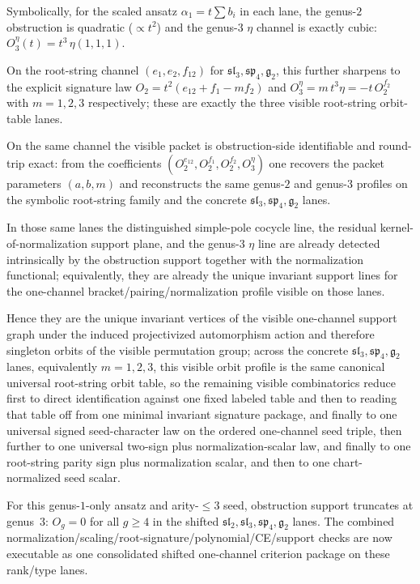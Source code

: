   Symbolically, for the scaled ansatz
  $\alpha_1=t\sum b_i$ in each lane, the genus-$2$ obstruction
  is quadratic ($\propto t^2$) and the genus-$3$ $\eta$ channel
  is exactly cubic:
  $O_3^\eta(t)=t^3\,\eta(1,1,1)$.

  On the root-string channel $(e_1,e_2,f_{12})$ for
  $\mathfrak{sl}_3,\mathfrak{sp}_4,\mathfrak{g}_2$, this further
  sharpens to the explicit signature law
  $O_2=t^2(e_{12}+f_1-m f_2)$ and
  $O_3^\eta=m\,t^3\eta=-t\,O_2^{f_2}$ with
  $m=1,2,3$ respectively; these are exactly the three visible
  root-string orbit-table lanes.

  On the same channel the visible packet is
  obstruction-side identifiable and round-trip exact: from the
  coefficients $(O_2^{e_{12}},O_2^{f_1},O_2^{f_2},O_3^\eta)$ one
  recovers the packet parameters $(a,b,m)$ and reconstructs the same
  genus-$2$ and genus-$3$ profiles on the symbolic root-string family
  and the concrete $\mathfrak{sl}_3,\mathfrak{sp}_4,\mathfrak{g}_2$
  lanes.

  In those same lanes the distinguished simple-pole cocycle
  line, the residual kernel-of-normalization support plane, and the
  genus-$3$ $\eta$ line are already detected intrinsically by the
  obstruction support together with the normalization functional;
  equivalently, they are already the unique invariant support lines
  for the one-channel bracket/pairing/normalization profile visible on
  those lanes.

  Hence they are the unique invariant vertices of the visible
  one-channel support graph under the induced projectivized
  automorphism action and therefore singleton orbits of the visible
  permutation group; across the concrete
  $\mathfrak{sl}_3,\mathfrak{sp}_4,\mathfrak{g}_2$ lanes, equivalently
  $m=1,2,3$, this visible orbit profile is the same canonical
  universal root-string orbit table, so the remaining visible
  combinatorics reduce first to direct identification against one fixed
  labeled table and then to reading that table off from one minimal
  invariant signature package, and finally to one universal signed
  seed-character law on the ordered one-channel seed triple, then
  further to one universal two-sign plus normalization-scalar law, and
  finally to one root-string parity sign plus normalization scalar,
  and then to one chart-normalized seed scalar.

  For this genus-$1$-only ansatz and arity-$\le 3$ seed,
  obstruction support truncates at genus~$3$:
  $O_g=0$ for all $g\ge 4$ in the shifted
  $\mathfrak{sl}_2,\mathfrak{sl}_3,\mathfrak{sp}_4,\mathfrak{g}_2$ lanes.
  The combined normalization/scaling/root-signature/polynomial/CE/support
  checks are now executable as one consolidated shifted one-channel
  criterion package on these rank/type lanes.

